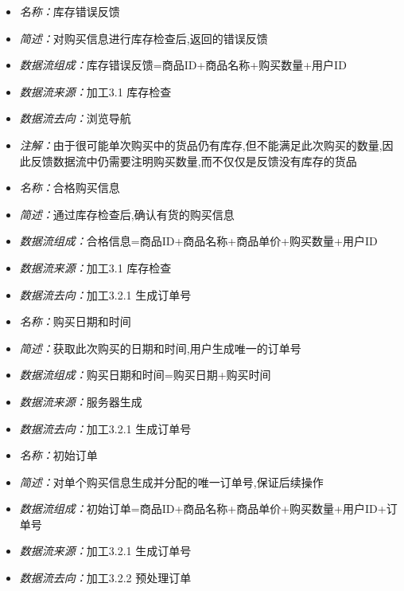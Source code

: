 \documentclass{article}
\begin{document}
\begin{CJK*}{UTF8}{gbsn}
\vspace{-1mm}

\begin{itemize}
	\item \textit{名称：}库存错误反馈
	\item \textit{简述：}对购买信息进行库存检查后,返回的错误反馈
	\item \textit{数据流组成：}库存错误反馈=商品ID+商品名称+购买数量+用户ID
	\item \textit{数据流来源：}加工3.1 库存检查
	\item \textit{数据流去向：}浏览导航
	\item \textit{注解：}由于很可能单次购买中的货品仍有库存,但不能满足此次购买的数量,因此反馈数据流中仍需要注明购买数量,而不仅仅是反馈没有库存的货品
\end{itemize}

\vspace{-1mm}

\begin{itemize}
	\item \textit{名称：}合格购买信息
	\item \textit{简述：}通过库存检查后,确认有货的购买信息
	\item \textit{数据流组成：}合格信息=商品ID+商品名称+商品单价+购买数量+用户ID
	\item \textit{数据流来源：}加工3.1 库存检查
	\item \textit{数据流去向：}加工3.2.1 生成订单号
\end{itemize}

\vspace{-1mm}

\begin{itemize}
	\item \textit{名称：}购买日期和时间
	\item \textit{简述：}获取此次购买的日期和时间,用户生成唯一的订单号
	\item \textit{数据流组成：}购买日期和时间=购买日期+购买时间
	\item \textit{数据流来源：}服务器生成
	\item \textit{数据流去向：}加工3.2.1 生成订单号
\end{itemize}

\vspace{-1mm}

\begin{itemize}
	\item \textit{名称：}初始订单
	\item \textit{简述：}对单个购买信息生成并分配的唯一订单号,保证后续操作
	\item \textit{数据流组成：}初始订单=商品ID+商品名称+商品单价+购买数量+用户ID+订单号
	\item \textit{数据流来源：}加工3.2.1 生成订单号
	\item \textit{数据流去向：}加工3.2.2 预处理订单
\end{itemize}


\end{CJK*}
\end{document}
